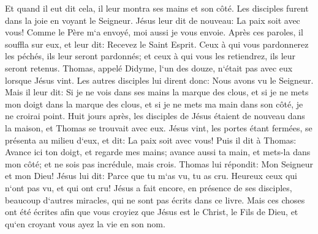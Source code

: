 \verse Et quand il eut dit cela, il leur montra ses mains et son côté. Les disciples furent dans la joie en voyant le Seigneur. 
\verse Jésus leur dit de nouveau: La paix soit avec vous! Comme le Père m`a envoyé, moi aussi je vous envoie. 
\verse Après ces paroles, il souffla sur eux, et leur dit: Recevez le Saint Esprit. 
\verse Ceux à qui vous pardonnerez les péchés, ils leur seront pardonnés; et ceux à qui vous les retiendrez, ils leur seront retenus. 
\verse Thomas, appelé Didyme, l`un des douze, n`était pas avec eux lorsque Jésus vint. 
\verse Les autres disciples lui dirent donc: Nous avons vu le Seigneur. Mais il leur dit: Si je ne vois dans ses mains la marque des clous, et si je ne mets mon doigt dans la marque des clous, et si je ne mets ma main dans son côté, je ne croirai point. 
\verse Huit jours après, les disciples de Jésus étaient de nouveau dans la maison, et Thomas se trouvait avec eux. Jésus vint, les portes étant fermées, se présenta au milieu d`eux, et dit: La paix soit avec vous! 
\verse Puis il dit à Thomas: Avance ici ton doigt, et regarde mes mains; avance aussi ta main, et mets-la dans mon côté; et ne sois pas incrédule, mais crois. 
\verse Thomas lui répondit: Mon Seigneur et mon Dieu! Jésus lui dit: 
\verse Parce que tu m`as vu, tu as cru. Heureux ceux qui n`ont pas vu, et qui ont cru! 
\verse Jésus a fait encore, en présence de ses disciples, beaucoup d`autres miracles, qui ne sont pas écrits dans ce livre. 
\verse Mais ces choses ont été écrites afin que vous croyiez que Jésus est le Christ, le Fils de Dieu, et qu`en croyant vous ayez la vie en son nom. 

